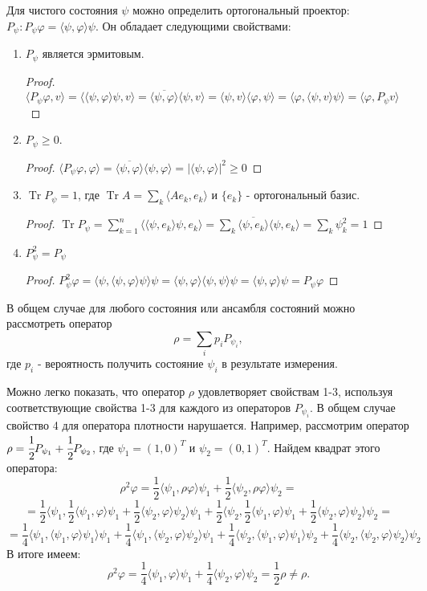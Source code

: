 \documentclass[11pt]{article}
\DeclareMathOperator{\Tr}{Tr}
\begin{document}
Для чистого состояния $\psi$ можно определить ортогональный проектор: $P_\psi: P_\psi\varphi = \langle \psi, \varphi \rangle \psi$. Он обладает следующими свойствами:
\begin{enumerate}
\item $P_\psi$ является эрмитовым. 
\begin{proof}
$\langle P_\psi\varphi, v\rangle = \langle \langle\psi,\varphi\rangle \psi, v\rangle = \overline{\langle\psi,\varphi\rangle} \langle\psi, v\rangle = \langle\psi, v\rangle \langle\varphi,\psi\rangle  = \langle\varphi, \langle\psi, v\rangle\psi\rangle = \langle\varphi, P_\psi v \rangle$
\end{proof}
\item $P_\psi \geq 0$.
\begin{proof}
$\langle P_\psi\varphi, \varphi\rangle = \overline{\langle\psi,\varphi\rangle} \langle\psi, \varphi\rangle = |\langle\psi, \varphi\rangle|^2 \geq 0$
\end{proof}
\item $\Tr P_\psi = 1$, где $\Tr A = \sum_k \langle Ae_k, e_k\rangle$ и $\{e_k\}$  - ортогональный базис.
\begin{proof}
$\Tr P_\psi = \sum_{k = 1}^n \langle \langle \psi, e_k\rangle\psi, e_k\rangle = \sum_k \overline{\langle\psi, e_k\rangle}\langle\psi, e_k\rangle = \sum_k\psi_k^2 = 1$
\end{proof}
\item $P_\psi^2 = P_\psi$
\begin{proof}
$P_\psi^2\varphi = \langle\psi, \langle\psi, \varphi\rangle \psi\rangle \psi = \langle\psi, \varphi\rangle \langle\psi, \psi\rangle\psi = \langle\psi, \varphi\rangle\psi = P_\psi\varphi $
\end{proof}
\end{enumerate}
В общем случае для любого состояния или ансамбля состояний можно рассмотреть оператор
\[
\rho = \sum_ip_iP_{\psi_i},
\]
где $p_i$  - вероятность получить состояние $\psi_i$ в результате измерения.

Можно легко показать, что оператор $\rho$ удовлетворяет свойствам 1-3, используя соответствующие свойства 1-3 для каждого из операторов $P_{\psi_i}$. В общем случае свойство 4 для оператора плотности нарушается. Например, рассмотрим оператор $\rho = \cfrac 12P_{\psi_1} + \cfrac 12P_{\psi_2}$, где $\psi_1 = (1, 0)^T$ и $\psi_2 = (0, 1)^T$. Найдем квадрат этого оператора:
\[
\rho^2\varphi = \frac 12\langle\psi_1, \rho\varphi\rangle\psi_1 + \frac 12\langle\psi_2, \rho\varphi\rangle\psi_2 =
\]
\[
= \frac 12\langle\psi_1, \frac 12\langle\psi_1, \varphi\rangle\psi_1 + \frac 12\langle\psi_2, \varphi\rangle\psi_2 \rangle\psi_1 + \frac 12\langle\psi_2, \frac 12\langle\psi_1, \varphi\rangle\psi_1 + \frac 12\langle\psi_2, \varphi\rangle\psi_2 \rangle\psi_2 =
\]
\[
 = 
\frac 14\langle\psi_1, \langle\psi_1,\varphi\rangle\psi_1\rangle\psi_1 + \frac 14\langle\psi_1, \langle\psi_2,\varphi\rangle\psi_2\rangle\psi_1 +
\frac 14\langle\psi_2, \langle\psi_1,\varphi\rangle\psi_1\rangle\psi_2 + \frac 14\langle\psi_2, \langle\psi_2,\varphi\rangle\psi_2\rangle\psi_2
\]
В итоге имеем:
\[
\rho^2\varphi = \frac 14 \langle\psi_1, \varphi\rangle\psi_1 + \frac 14\langle\psi_2, \varphi\rangle\psi_2 = \frac 12\rho \neq \rho.
\]
\end{document}
